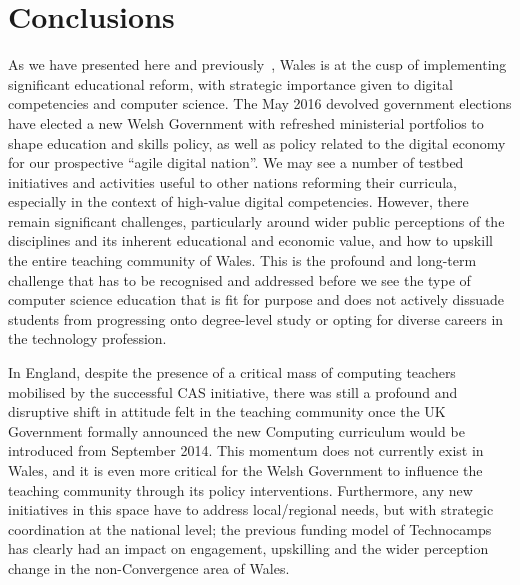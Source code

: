\documentclass{llncs}
\begin{document}
\section{Conclusions}\label{conclusions}


As we have presented here and
previously~\cite{crick+moller-wipsce2015}, Wales is at the cusp of
implementing significant educational reform, with strategic importance
given to digital competencies and computer science. The May 2016
devolved government elections have elected a new Welsh Government with
refreshed ministerial portfolios to shape education and skills policy,
as well as policy related to the digital economy for our prospective
``agile digital nation''.  We may see a number of testbed initiatives
and activities useful to other nations reforming their curricula,
especially in the context of high-value digital competencies.
However, there remain significant challenges, particularly around
wider public perceptions of the disciplines and its inherent
educational and economic value, and how to upskill the entire teaching
community of Wales. This is the profound and long-term challenge that
has to be recognised and addressed before we see the type of computer
science education that is fit for purpose and does not actively
dissuade students from progressing onto degree-level study or opting
for diverse careers in the technology profession.

In England, despite the presence of a critical mass of computing
teachers mobilised by the successful CAS initiative, there was still a
profound and disruptive shift in attitude felt in the teaching
community once the UK Government formally announced the new Computing
curriculum would be introduced from September 2014.  This momentum
does not currently exist in Wales, and it is even more critical for
the Welsh Government to influence the teaching community through its
policy interventions. Furthermore, any new initiatives in this space
have to address local/regional needs, but with strategic coordination
at the national level; the previous funding model of Technocamps has
clearly had an impact on engagement, upskilling and the wider
perception change in the non-Convergence area of Wales.
\end{document}
